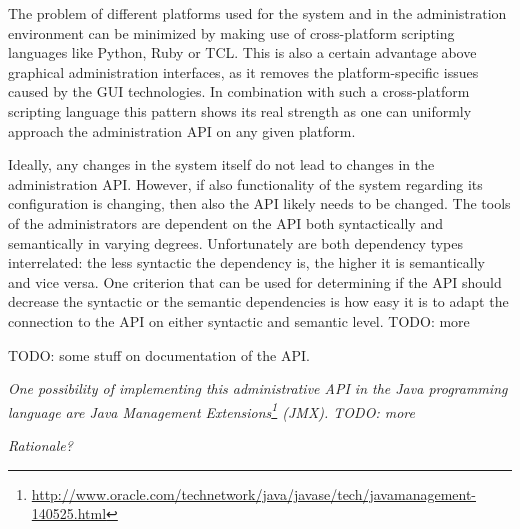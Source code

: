 The problem of different platforms used for the system and in the administration environment can be minimized by making use of cross-platform scripting languages like Python, Ruby or TCL. This is also a certain advantage above graphical administration interfaces, as it removes the platform-specific issues caused by the GUI technologies. In combination with such a cross-platform scripting language this pattern shows its real strength as one can uniformly approach the administration API on any given platform.

Ideally, any changes in the system itself do not lead to changes in the administration API. However, if also functionality of the system regarding its configuration is changing, then also the API likely needs to be changed. The tools of the administrators are dependent on the API both syntactically and semantically in varying degrees. Unfortunately are both dependency types interrelated: the less syntactic the dependency is, the higher it is semantically and vice versa. One criterion that can be used for determining if the API should decrease the syntactic or the semantic dependencies is how easy it is to adapt the connection to the API on either syntactic and semantic level. TODO: more

TODO: some stuff on documentation of the API.




\textit{One possibility of implementing this administrative API in the Java programming language are Java Management Extensions\footnote{\url{http://www.oracle.com/technetwork/java/javase/tech/javamanagement-140525.html}} (JMX). TODO: more }

\begin{center}
   
\end{center}

\textit{Rationale?}\\

